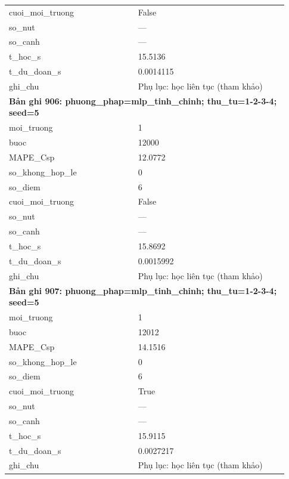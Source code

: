\begin{longtable}{p{0.43\linewidth}p{0.50\linewidth}}
cuoi\_\allowbreak moi\_\allowbreak truong & False \\
so\_\allowbreak nut & — \\
so\_\allowbreak canh & — \\
t\_\allowbreak hoc\_\allowbreak s & 15.5136 \\
t\_\allowbreak du\_\allowbreak doan\_\allowbreak s & 0.0014115 \\
ghi\_\allowbreak chu & Phụ lục: học liên tục (tham khảo) \\
\midrule
\multicolumn{2}{p{0.95\linewidth}}{\textbf{Bản ghi 906: phuong\_phap=mlp\_tinh\_chinh; thu\_tu=1-2-3-4; seed=5}} \\
moi\_\allowbreak truong & 1 \\
buoc & 12000 \\
MAPE\_\allowbreak Csp & 12.0772 \\
so\_\allowbreak khong\_\allowbreak hop\_\allowbreak le & 0 \\
so\_\allowbreak diem & 6 \\
cuoi\_\allowbreak moi\_\allowbreak truong & False \\
so\_\allowbreak nut & — \\
so\_\allowbreak canh & — \\
t\_\allowbreak hoc\_\allowbreak s & 15.8692 \\
t\_\allowbreak du\_\allowbreak doan\_\allowbreak s & 0.0015992 \\
ghi\_\allowbreak chu & Phụ lục: học liên tục (tham khảo) \\
\midrule
\multicolumn{2}{p{0.95\linewidth}}{\textbf{Bản ghi 907: phuong\_phap=mlp\_tinh\_chinh; thu\_tu=1-2-3-4; seed=5}} \\
moi\_\allowbreak truong & 1 \\
buoc & 12012 \\
MAPE\_\allowbreak Csp & 14.1516 \\
so\_\allowbreak khong\_\allowbreak hop\_\allowbreak le & 0 \\
so\_\allowbreak diem & 6 \\
cuoi\_\allowbreak moi\_\allowbreak truong & True \\
so\_\allowbreak nut & — \\
so\_\allowbreak canh & — \\
t\_\allowbreak hoc\_\allowbreak s & 15.9115 \\
t\_\allowbreak du\_\allowbreak doan\_\allowbreak s & 0.0027217 \\
ghi\_\allowbreak chu & Phụ lục: học liên tục (tham khảo) \\

\end{longtable}
